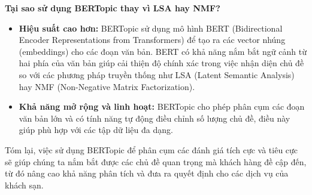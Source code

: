\textbf{Tại sao sử dụng BERTopic thay vì LSA hay NMF?}
\begin{itemize}
    \item \textbf{Hiệu suất cao hơn:} BERTopic sử dụng mô hình BERT (Bidirectional Encoder Representations from Transformers) để tạo ra các vector nhúng (embeddings) cho các đoạn văn bản. BERT có khả năng nắm bắt ngữ cảnh từ hai phía của văn bản giúp cải thiện độ chính xác trong việc nhận diện chủ đề so với các phương pháp truyền thống như LSA (Latent Semantic Analysis) hay NMF (Non-Negative Matrix Factorization).
    \item \textbf{Khả năng mở rộng và linh hoạt:} BERTopic cho phép phân cụm các đoạn văn bản lớn và có tính năng tự động điều chỉnh số lượng chủ đề, điều này giúp phù hợp với các tập dữ liệu đa dạng.
\end{itemize}

Tóm lại, việc sử dụng BERTopic để phân cụm các đánh giá tích cực và tiêu cực sẽ giúp chúng ta nắm bắt được các chủ đề quan trọng mà khách hàng đề cập đến, từ đó nâng cao khả năng phân tích và đưa ra quyết định cho các dịch vụ của khách sạn.

